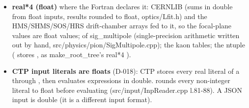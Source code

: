 \begin{itemize}
first 8 bytes of the 16-byte value) give garbage values: the HRS transport lengths and the 45° VDC rotation
(D-061 F1/F1e: zd = −3.13e232, rotation 0°), the kaon  arguments (D-043), the Delta  arguments
(D-048 F3). These are Category A bugs: corrected by default, reproduced in  (the garbage bit patterns
are computed exactly, e.g. ).
\item \textbf{real*4 (float)} where the Fortran declares it: CERNLIB  (sums in double from float inputs, results rounded
to float, optics/\allowbreak{}Lfit.\allowbreak{}h) and the HMS/\allowbreak{}SHMS/\allowbreak{}SOS/\allowbreak{}HRS drift-chamber arrays fed to it, so the focal-plane values are
float values;  of sig\_\allowbreak{}multipole (single-precision arithmetic written out by hand,
src/\allowbreak{}physics/\allowbreak{}pion/\allowbreak{}SigMultipole.\allowbreak{}cpp); the kaon  tables; the ntuple ( stores , as
make\_\allowbreak{}root\_\allowbreak{}tree's real*4 ).
\item \textbf{CTP input literals are floats} (D-018): CTP stores every real literal of a  through , then evaluates
expressions in double.  rounds every non-integer literal to float before evaluating
(src/\allowbreak{}input/\allowbreak{}InpReader.\allowbreak{}cpp l.81-88). A JSON input is double (it is a different input format).
\end{itemize}
